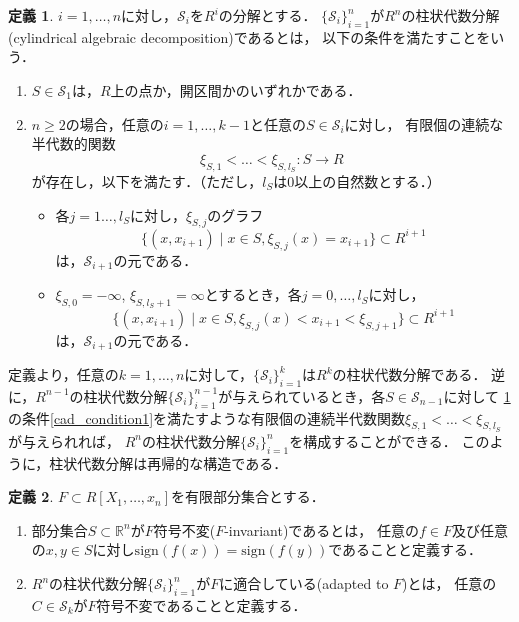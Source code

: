 \documentclass[uplatex, dvipdfmx]{jsarticle}
\newcommand{\R}{\mathbb{R}}
\newcommand{\calS}{\mathcal{S}}
\newcommand{\sign}{\mathrm{sign}}
\newcommand{\map}[3]{{#1}:{#2}\rightarrow{#3}}
\theoremstyle{definition}
\newtheorem{definition}{定義}[section]
\begin{document}
\begin{definition} \label{definition:cad}
     $i=1, \dots, n$に対し，$\calS_i$を$R^i$の分解とする．
     $\{\calS_i\}_{i=1}^n$が$R^n$の柱状代数分解(cylindrical algebraic decomposition)であるとは，
     以下の条件を満たすことをいう．
     \begin{enumerate}
          \item $S \in \calS_1$は，$R$上の点か，開区間かのいずれかである．
          \item $n\geq 2$の場合，任意の$i=1, \dots, k-1$と任意の$S \in \calS_i$に対し，
          有限個の連続な半代数的関数
          \[
               \map{\xi_{S,1}< \dots <\xi_{S,l_S}}{S}{R}
          \]
          が存在し，以下を満たす．（ただし，$l_S$は0以上の自然数とする．）
          \begin{itemize}
               \item 各$j=1 \dots, l_S$に対し，$\xi_{S,j}$のグラフ
               \[
                    \{(x,x_{i+1}) \mid x \in S, \xi_{S,j}(x)=x_{i+1} \} \subset R^{i+1}
               \]
               は，$\calS_{i+1}$の元である．
               \item $\xi_{S,0}=-\infty$, $\xi_{S,l_S+1}=\infty$とするとき，各$j=0, \dots, l_S$に対し，\label{cad_condition1}
               \[
                    \{(x,x_{i+1}) \mid x \in S, \xi_{S,j}(x)<x_{i+1}<\xi_{S,j+1} \} \subset R^{i+1}
               \]
               は，$\calS_{i+1}$の元である．
          \end{itemize}
     \end{enumerate}
\end{definition}

定義より，任意の$k=1, \dots, n$に対して，$\{\calS_i\}_{i=1}^k$は$R^k$の柱状代数分解である．
逆に，$R^{n-1}$の柱状代数分解$\{\calS_i\}_{i=1}^{n-1}$が与えられているとき，各$S \in \calS_{n-1}$に対して
\cref{definition:cad}の条件\ref{cad_condition1}を満たすような有限個の連続半代数関数$\xi_{S,1}<\dots<\xi_{S,l_S}$が与えられれば，
$R^n$の柱状代数分解$\{\calS_i\}_{i=1}^n$を構成することができる．
このように，柱状代数分解は再帰的な構造である．

\begin{definition}
     $F \subset R[X_1, \dots, x_n]$を有限部分集合とする．
     \begin{enumerate}
          \item 部分集合$S \subset \R^n$が$F$符号不変($F$-invariant)であるとは，
          任意の$f \in F$及び任意の$x,y \in S$に対し$\sign(f(x))=\sign(f(y))$であることと定義する．
          \item $R^n$の柱状代数分解$\{\calS_i\}_{i=1}^n$が$F$に適合している(adapted to $F$)とは，
          任意の$C \in \calS_k$が$F$符号不変であることと定義する．
     \end{enumerate}
\end{definition}
\end{document}

